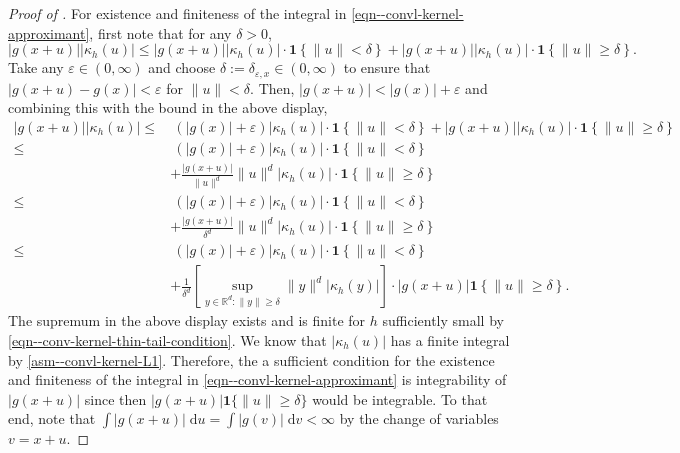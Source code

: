 \begin{proof}[Proof of ]
For existence and finiteness of the integral in
\eqref{eqn--convl-kernel-approximant}, first note that for any \(\delta > 0\),
\begin{equation*}
  |g (x + u)| \left| \kappa_{h} (u) \right| \leq |g (x + u)| \left| \kappa_{h}
  (u) \right|
  \cdot \mathbf{1} \left\{ \|u\| < \delta \right\} + |g (x + u)| \left|
  \kappa_{h} (u) \right| \cdot \mathbf{1} \left\{ \|u\| \geq \delta \right\}.
\end{equation*}
Take any \(\varepsilon \in (0, \infty)\) and choose \(\delta :=
\delta_{\varepsilon, x} \in (0, \infty)\) to ensure that \(|g (x + u) - g (x)| <
\varepsilon\) for \(\|u\| < \delta\).
Then, \(|g (x + u)| < |g (x)| + \varepsilon\) and combining this with the bound
in the above display,
\begin{align*}
  |g (x + u)| \left| \kappa_{h} (u) \right| \leq
  & \ (|g (x)| + \varepsilon) \left| \kappa_{h} (u) \right|
  \cdot \mathbf{1} \left\{ \|u\| < \delta \right\} + |g (x + u)| \left|
  \kappa_{h} (u) \right| \cdot \mathbf{1} \left\{ \|u\| \geq \delta \right\} \\
  \leq
  & \ (|g (x)| + \varepsilon) \left| \kappa_{h} (u) \right| \cdot \mathbf{1}
  \left\{ \|u\| < \delta \right\} \\
  & + \frac{|g (x + u)|}{\|u\|^{d}} \|u\|^{d} \left| \kappa_{h} (u) \right|
  \cdot \mathbf{1} \left\{ \|u\| \geq \delta \right\} \\
  \leq
  & \ (|g (x)| + \varepsilon) \left| \kappa_{h} (u) \right| \cdot \mathbf{1}
  \left\{ \|u\| < \delta \right\} \\
  & + \frac{|g (x + u)|}{\delta^{d}} \|u\|^{d} \left| \kappa_{h} (u) \right|
  \cdot \mathbf{1} \left\{ \|u\| \geq \delta \right\} \\
  \leq
  & \ (|g (x)| + \varepsilon) \left| \kappa_{h} (u) \right| \cdot \mathbf{1}
  \left\{ \|u\| < \delta \right\} \\
  & + \frac{1}{\delta^{d}} \left[ \sup_{y \in \mathbb{R}^{d} : \|y\| \geq
  \delta} \|y\|^{d} \left| \kappa_{h} (y) \right| \right] \cdot |g (x + u)|
  \mathbf{1} \left\{ \|u\| \geq \delta \right\}.
\end{align*}
The supremum in the above display exists and is finite for \(h\) sufficiently
small by \eqref{eqn--conv-kernel-thin-tail-condition}.
We know that \(\left| \kappa_{h} (u) \right|\) has a finite integral by
 \ref{asm--convl-kernel-L1}.
Therefore, the a sufficient condition for the existence and finiteness of the
integral in \eqref{eqn--convl-kernel-approximant} is integrability of \(|g (x +
u)|\) since then \(|g (x + u)| \mathbf{1} \{\|u\| \geq \delta\}\) would be
integrable.
To that end, note that \(\int |g (x + u)| \; \mathrm{d} u = \int |g (v)| \;
\mathrm{d} v < \infty\) by the change of variables \(v = x + u\).


\end{proof}
